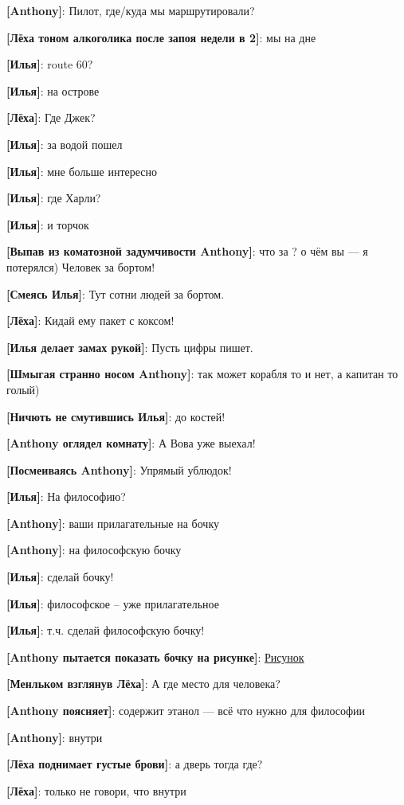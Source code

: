 \begin{flushleft}
\textbf{[Anthony]}: Пилот, где/куда мы маршрутировали?

\textbf{[Лёха тоном алкоголика после запоя недели в 2]}: мы на дне

\textbf{[Илья]}: route 60?

\textbf{[Илья]}: на острове

\textbf{[Лёха]}: Где Джек?

\textbf{[Илья]}: за водой пошел

\textbf{[Илья]}: мне больше интересно

\textbf{[Илья]}: где Харли?

\textbf{[Илья]}: и торчок

\textbf{[Выпав из коматозной задумчивости Anthony]}: что за ? о чём вы --- я потерялся) Человек за бортом!

\textbf{[Смеясь Илья]}: Тут сотни людей за бортом.

\textbf{[Лёха]}: Кидай ему пакет с коксом!

\textbf{[Илья делает замах рукой]}: Пусть цифры пишет.

\textbf{[Шмыгая странно носом Anthony]}: так может корабля то и нет, а капитан то голый)

\textbf{[Ничють не смутившись Илья]}: до костей!

\textbf{[Anthony оглядел комнату]}: А Вова уже выехал!

\textbf{[Посмеиваясь Anthony]}: Упрямый ублюдок!

\textbf{[Илья]}: На философию?

\textbf{[Anthony]}: ваши прилагательные на бочку

\textbf{[Anthony]}: на философскую бочку

\textbf{[Илья]}: сделай бочку!

\textbf{[Илья]}: философское -- уже прилагательное

\textbf{[Илья]}: т.ч. сделай философскую бочку!

\textbf{[Anthony пытается показать бочку на рисунке]}: \href{https://thumbs.dreamstime.com/thumb_850/8505013.jpg}{Рисунок}

\textbf{[Менльком взглянув Лёха]}: А где место для человека?

\textbf{[Anthony поясняет]}: содержит этанол --- всё что нужно для философии

\textbf{[Anthony]}: внутри

\textbf{[Лёха поднимает густые брови]}: а дверь тогда где?

\textbf{[Лёха]}: только не говори, что внутри


\end{flushleft}

